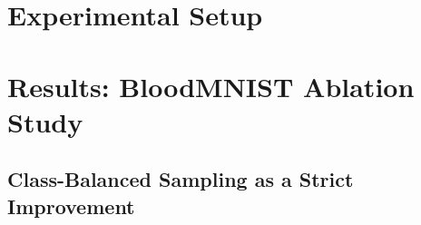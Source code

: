 \documentclass[letterpaper]{article} %
\begin{document}
\section{Experimental Setup}

\section{Results: BloodMNIST Ablation Study}

\subsection{Class-Balanced Sampling as a Strict Improvement}
\end{document}

